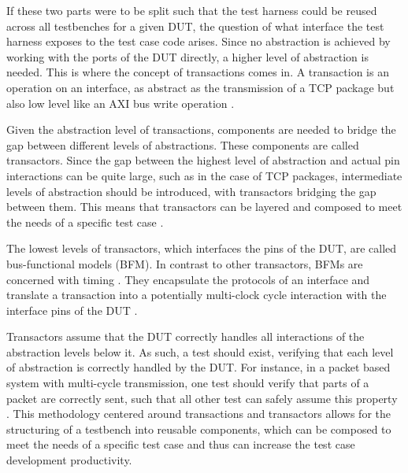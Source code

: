 If these two parts were to be split such that the test harness could be reused across all testbenches for a given
DUT, the question of what interface the test harness exposes to the test case code arises. Since no abstraction is
achieved by working with the ports of the DUT directly, a higher level of abstraction is needed. This is where the
concept of transactions comes in. A transaction is an operation on an interface, as abstract as the transmission of a
TCP package but also low level like an AXI bus write operation \cite[Ch. 1]{bergeron2005verification}.

Given the abstraction level of transactions, components are needed to bridge the gap between different levels of
abstractions. These components are called transactors. Since the gap between the highest level of
abstraction and actual pin interactions can be quite large, such as in the case of TCP packages, intermediate levels
of abstraction should be introduced, with transactors bridging the gap between them. This means that transactors can
be layered and composed to meet the needs of a specific test case \cite[Ch. 4]{bergeron2012writing}.

The lowest levels of transactors, which interfaces the pins of the DUT, are called bus-functional models (BFM). In
contrast to other transactors, BFMs are concerned with timing \cite[Ch. 4]{bergeron2012writing}. They encapsulate the
protocols of an interface and translate a transaction into a potentially multi-clock cycle interaction with the
interface pins of the DUT \cite[Ch. 3]{salemi2013uvm}.

Transactors assume that the DUT correctly handles all interactions of the abstraction levels below it. As such, a
test should exist, verifying that each level of abstraction is correctly handled by the DUT. For instance, in a
packet based system with multi-cycle transmission, one test should verify that parts of a packet are correctly sent,
such that all other test can safely assume this property \cite[Ch. 6]{bergeron2012writing}. This methodology centered
around transactions and transactors allows for the structuring of a testbench into reusable components, which can be
composed to meet the needs of a specific test case and thus can increase the test case development productivity.

